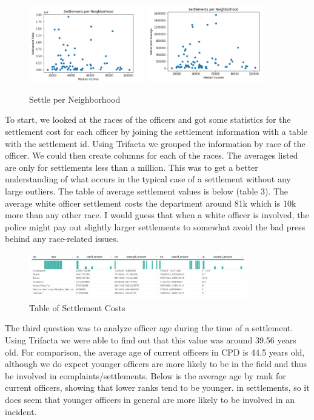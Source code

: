 \documentclass[11pt]{article}
\begin{document}
\begin{figure}[h!]
\centering
\caption{Settle per Neighborhood}
\includegraphics[width=0.45\textwidth]{settle1.png}
\includegraphics[width=0.45\textwidth]{settle2.png}
\end{figure}

To start, we looked at the races of the officers and got some statistics for the settlement cost for each officer by joining the settlement information with a table with the settlement id. Using Trifacta we grouped the information by race of the officer. We could then create columns for each of the races. The averages listed are only for settlements less than a million. This was to get a better understanding of what occurs in the typical case of a settlement without any large outliers. The table of average settlement values is below (table 3). The average white officer settlement costs the department around 81k which is 10k more than any other race. I would guess that when a white officer is involved, the police might pay out slightly larger settlements to somewhat avoid the bad press behind any
race-related issues. 

\begin{figure}[h!]
\centering
\caption{Table of Settlement Costs}
\includegraphics[width=0.85\textwidth]{RaceTable.PNG}
\end{figure}

The third question was to analyze officer age during the time of a settlement. Using Trifacta we were able to find out that this value was around 39.56 years old. For comparison, the average age of current officers in CPD is 44.5 years old, although we do expect younger officers are more likely to be in the field and thus be involved in complaints/settlements. Below is the average age by rank for current officers, showing that lower ranks tend to be younger. in settlements, so it does seem that younger officers in general are more likely to be involved in an incident.
\end{document}
